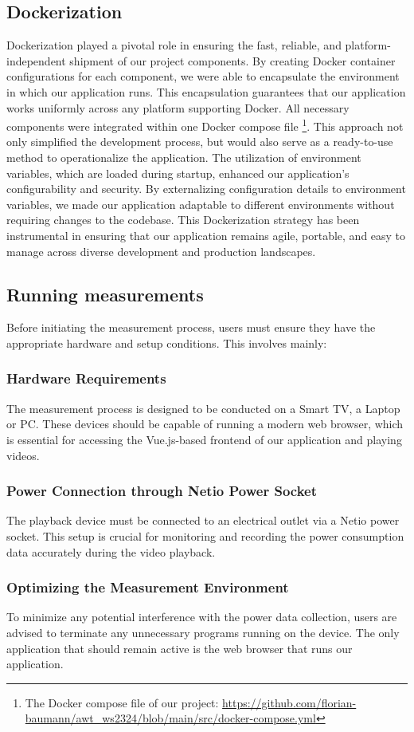 \subsection{Dockerization}
Dockerization played a pivotal role in ensuring the fast, reliable, and platform-independent shipment of our project components. By creating Docker container configurations for each component, we were able to encapsulate the environment in which our application runs. This encapsulation guarantees that our application works uniformly across any platform supporting Docker. All necessary components were integrated within one Docker compose file \footnote{The Docker compose file of our project: \url{https://github.com/florian-baumann/awt_ws2324/blob/main/src/docker-compose.yml}}. This approach not only simplified the development process, but would also serve as a ready-to-use method to operationalize the application. The utilization of environment variables, which are loaded during startup, enhanced our application's configurability and security. By externalizing configuration details to environment variables, we made our application adaptable to different environments without requiring changes to the codebase. This Dockerization strategy has been instrumental in ensuring that our application remains agile, portable, and easy to manage across diverse development and production landscapes.

\subsection{Running measurements}
Before initiating the measurement process, users must ensure they have the appropriate hardware and setup conditions. This involves mainly:
\subsubsection{Hardware Requirements} The measurement process is designed to be conducted on a Smart TV, a Laptop or PC. These devices should be capable of running a modern web browser, which is essential for accessing the Vue.js-based frontend of our application and playing videos.
\subsubsection{Power Connection through Netio Power Socket} The playback device must be connected to an electrical outlet via a Netio power socket. This setup is crucial for monitoring and recording the power consumption data accurately during the video playback.
\subsubsection{Optimizing the Measurement Environment} To minimize any potential interference with the power data collection, users are advised to terminate any unnecessary programs running on the device. The only application that should remain active is the web browser that runs our application.\\

